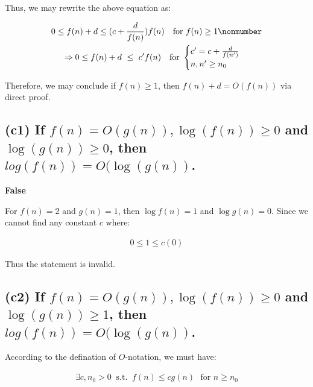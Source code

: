 \documentclass[12pt]{article}
\begin{document}
Thus, we may rewrite the above equation as:


\begin{gather}
 0 \leq f(n)+d \leq (c + \frac{d}{f(n)})f(n) \ \ \ \text{for $f(n) \geq 1$} \nonmumber\\
 \Rightarrow 0 \leq f(n)+d \ \leq \ c'f(n) \ \ \ \text{for } \begin{cases}
                 c' = c + \frac{d}{f(n')} \\
                 n, n' \geq n_{0}
             \end{cases}
\end{gather}

Therefore, we may conclude if $f(n) \geq 1$, then $f(n) + d = O(f(n))$ via direct proof.




\subsection{(c1) If $f(n) = O(g(n)), \log(f(n)) \geq 0$ and $\log(g(n)) \geq 0$, then $log(f(n)) = O(\log(g(n))$.}

\textbf{False}

For $f(n) = 2$ and $g(n) = 1$, then $\log f(n) = 1$ and $\log g(n) = 0$. Since we cannot find any constant $c$ where:

\begin{gather}
    0 \leq 1 \leq c(0)
\end{gather}

Thus the statement is invalid.

\subsection{(c2) If $f(n) = O(g(n)), \log(f(n)) \geq 0$ and $\log(g(n)) \geq 1$, then $log(f(n)) = O(\log(g(n))$.}



According to the defination of $O$-notation, we must have:

\begin{gather}
    \exists c, n_{0} > 0 \ \text{ s.t. } \ f(n) \leq cg(n) \ \ \ \text{for $n \geq n_{0}$}
\end{gather}
\end{document}
